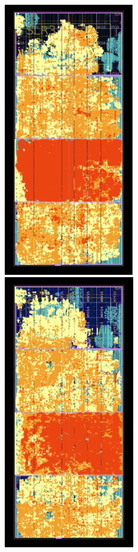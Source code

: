 \begin{figure}
\begin{minipage}[b]{.33\linewidth}
\centering
\includegraphics[height=12cm]{fig/SL/Metrics_before.png}
\end{minipage}%
\begin{minipage}[b]{.33\linewidth}
\centering
\includegraphics[height=12cm]{fig/SL/Metrics_shiftreg.png}

\end{minipage}
\end{figure}
